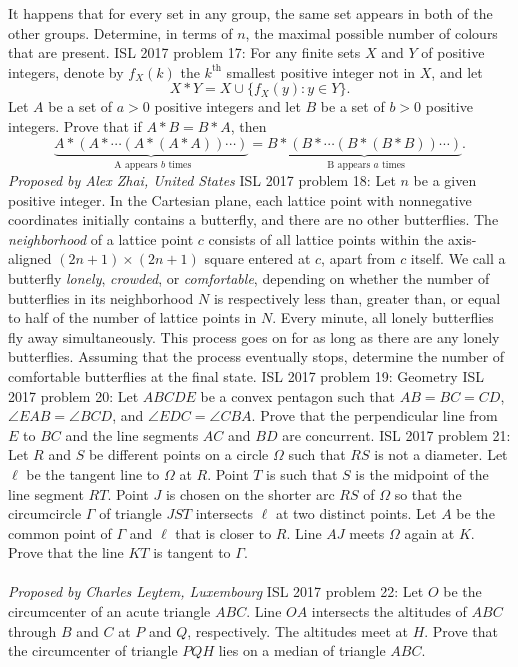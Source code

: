 It happens that for every set in any group, the same set appears in both of the other groups. Determine, in terms of $n$, the maximal possible number of colours that are present. 
ISL 2017 problem 17:  For any finite sets $X$ and $Y$ of positive integers, denote by $f_X(k)$ the $k^{\text{th}}$ smallest positive integer not in $X$, and let
\[ X*Y=X\cup \{ f_X(y):y\in Y\}. \]
Let  $A$ be a set of $a>0$ positive integers and let $B$ be a set of $b>0$ positive integers. Prove that if $A*B=B*A$, then
\[
\underbrace{A*(A*\cdots (A*(A*A))\cdots )}_{\text{ A appears $b$ times}}=\underbrace{B*(B*\cdots (B*(B*B))\cdots )}_{\text{ B appears $a$ times}}.
\]
\textit{Proposed by Alex Zhai, United States} 
ISL 2017 problem 18:  Let $n$ be a given positive integer. In the Cartesian plane, each lattice point with nonnegative coordinates initially contains a butterfly, and there are no other butterflies. The \textit{neighborhood} of a lattice point $c$ consists of all lattice points within the axis-aligned $(2n+1) \times (2n+1)$ square entered at $c$, apart from $c$ itself. We call a butterfly \textit{lonely}, \textit{crowded}, or \textit{comfortable}, depending on whether the number of butterflies in its neighborhood $N$ is respectively less than, greater than, or equal to half of the number of lattice points in $N$. Every minute, all lonely butterflies fly away simultaneously. This process goes on for as long as there are any lonely butterflies. Assuming that the process eventually stops, determine the number of comfortable butterflies at the final state. 
ISL 2017 problem 19:  Geometry 
ISL 2017 problem 20:  Let $ABCDE$ be a convex pentagon such that $AB=BC=CD$, $\angle{EAB}=\angle{BCD}$, and $\angle{EDC}=\angle{CBA}$. Prove that the perpendicular line from $E$ to $BC$ and the line segments $AC$ and $BD$ are concurrent. 
ISL 2017 problem 21:  Let $R$ and $S$ be different points on a circle $\Omega$ such that $RS$ is not a diameter. Let $\ell$ be the tangent line to $\Omega$ at $R$. Point $T$ is such that $S$ is the midpoint of the line segment $RT$. Point $J$ is chosen on the shorter arc $RS$ of $\Omega$ so that the circumcircle $\Gamma$ of triangle $JST$ intersects $\ell$ at two distinct points. Let $A$ be the common point of $\Gamma$ and $\ell$ that is closer to $R$. Line $AJ$ meets $\Omega$ again at $K$. Prove that the line $KT$ is tangent to $\Gamma$. \\\\
\textit{Proposed by Charles Leytem, Luxembourg} 
ISL 2017 problem 22:  Let $O$ be the circumcenter of an acute triangle $ABC$. Line $OA$ intersects the altitudes of $ABC$ through $B$ and $C$ at $P$ and $Q$, respectively. The altitudes meet at $H$. Prove that the circumcenter of triangle $PQH$ lies on a median of triangle $ABC$. 
